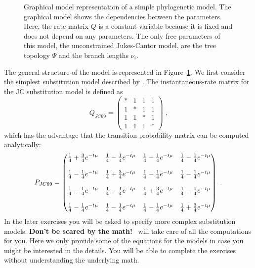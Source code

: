 \begin{figure}[h!]
\centering
{}
\caption{\small Graphical model representation of a simple phylogenetic model. 
The graphical model shows the dependencies between the parameters.
Here, the rate matrix $Q$ is a constant variable because it is fixed and does not depend on any parameters.
The only free parameters of this model, the unconstrained Jukes-Cantor model, are the tree topology $\Psi$ and the branch lengths $\nu_i$.}
\label{fig:jc}
\end{figure}

The general structure of the model is represented in Figure~\ref{fig:jc}.
We first consider the simplest substitution model described by \citet{Jukes1969}.
The instantaneous-rate matrix for the JC substitution model is defined as
\begin{equation*}
Q_{JC69} = \begin{pmatrix} 
{*} & {1} & {1} & {1} \\ 
{1} & {*} & {1} & {1} \\ 
{1} & {1} & {*} & {1} \\ 
{1} & {1} & {1} & {*}  
\end{pmatrix} \mbox{  ,}
\end{equation*}
which has the advantage that the transition probability matrix can be computed analytically:
\begin{equation*}
P_{JC69} = \begin{pmatrix} {{1\over4} + {3\over4}e^{-t\mu}} & {{1\over4} - {1\over4}e^{-t\mu}} & {{1\over4} - {1\over4}e^{-t\mu}} & {{1\over4} - {1\over4}e^{-t\mu}} \\\\ {{1\over4} - {1\over4}e^{-t\mu}} & {{1\over4} + {3\over4}e^{-t\mu}} & {{1\over4} - {1\over4}e^{-t\mu}} & {{1\over4} - {1\over4}e^{-t\mu}} \\\\ {{1\over4} - {1\over4}e^{-t\mu}} & {{1\over4} - {1\over4}e^{-t\mu}} & {{1\over4} + {3\over4}e^{-t\mu}} & {{1\over4} - {1\over4}e^{-t\mu}} \\\\ {{1\over4} - {1\over4}e^{-t\mu}} & {{1\over4} - {1\over4}e^{-t\mu}} & {{1\over4} - {1\over4}e^{-t\mu}} & {{1\over4} + {3\over4}e^{-t\mu}}  
\end{pmatrix} \mbox{  .}
\end{equation*}
In the later exercises you will be asked to specify more complex substitution models.
\textbf{Don't be scared by the math!}
\RevBayes~will take care of all the computations for you.
Here we only provide some of the equations for the models in case you might be interested in the details.
You will be able to complete the exercises without understanding the underlying math.



